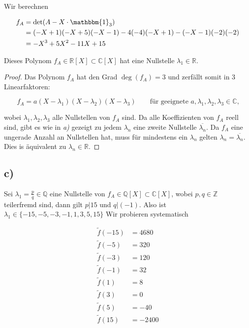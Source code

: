\documentclass{article}
\newcommand{\ZZ}{\mathbb{Z}}
\newcommand{\QQ}{\mathbb{Q}}
\newcommand{\RR}{\mathbb{R}}
\newcommand{\CC}{\mathbb{C}}
\begin{document}
Wir berechnen

\[
\begin{aligned}
  f_A
  &=
  \det(A - X \cdot \mathbbm{1}_3 ) \\
  &=
  (-X+1)(-X+5)(-X-1)-4(-4)(-X+1)-(-X-1)(-2)(-2)\\
  &=
  -X^3+5X^2-11X+15
\end{aligned}
\]

Dieses Polynom $f_A \in \RR[X] \subset \CC[X]$
hat eine Nullstelle $\lambda_1 \in \RR$.

\begin{proof}
  Das Polynom $f_A$ hat den Grad $\deg(f_A) = 3$
  und zerfällt somit in $3$ Linearfaktoren:

  \[
  f_A = a(X - \lambda_1)(X - \lambda_2)(X - \lambda_3) \qquad
  \text{für geeignete $a,\lambda_1,\lambda_2,\lambda_3 \in \CC$,}
  \]

  wobei $\lambda_1,\lambda_2,\lambda_3$
  alle Nullstellen von $f_A$ sind.
  Da alle Koeffizienten von $f_A$ reell sind, gibt es wie in
  \textit{a)} gezeigt zu jedem $\lambda_n$ eine
  zweite Nullstelle $\overline{\lambda_n}$.
  Da $f_A$ eine ungerade Anzahl an Nullstellen hat,
  muss für mindestens ein $\lambda_n$
  gelten $\lambda_n = \overline{\lambda_n}$.
  Dies is äquivalent zu $\lambda_n \in \RR$.
\end{proof}

\newpage

\subsection*{c)}

Sei $\lambda_1 = \frac{p}{q} \in \QQ$ eine Nullstelle
von $f_A \in \QQ[X] \subset \CC[X]$, wobei $p,q \in \ZZ$
teilerfremd sind, 
dann gilt $p|15$ und $q|(-1)$.
Also ist $\lambda_1 \in \{ -15, -5, -3, -1, 1, 3, 5, 15 \}$
Wir probieren systematisch

\[
\begin{aligned}
  \tilde{f}(-15) &= 4680\\
  \tilde{f}(-5) &= 320\\
  \tilde{f}(-3) &= 120\\
  \tilde{f}(-1) &= 32\\
  \tilde{f}(1) &= 8\\
  \tilde{f}(3) &= 0\\
  \tilde{f}(5) &= -40\\
  \tilde{f}(15) &= -2400\\
\end{aligned}
\]
\end{document}
